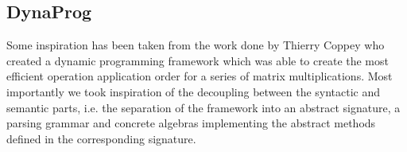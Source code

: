 \subsection{DynaProg}
Some inspiration has been taken from the work done by Thierry Coppey who created a dynamic programming framework which was able to create the most efficient operation application order for a series of matrix multiplications.
Most importantly we took inspiration of the decoupling between the syntactic and semantic parts, i.e. the separation of the framework into an abstract signature, a parsing grammar and concrete algebras implementing the abstract methods defined in the corresponding signature.

